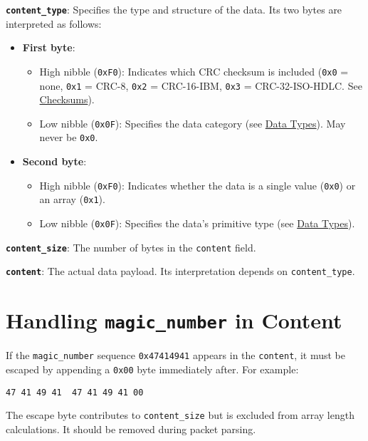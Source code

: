 \documentclass[a4paper]{article}
\begin{document}
\textbf{\texttt{content\_type}}: Specifies the type and structure of the data. Its two bytes are interpreted as follows:
\begin{itemize}
  \item \textbf{First byte}:
  \begin{itemize}
    \item High nibble (\texttt{0xF0}): Indicates which CRC checksum is included (\texttt{0x0} = none, \texttt{0x1} = CRC-8, \texttt{0x2} = CRC-16-IBM, \texttt{0x3} = CRC-32-ISO-HDLC. See \hyperref[checksums]{Checksums}).
    \item Low nibble (\texttt{0x0F}): Specifies the data category  (see \hyperref[data-types]{Data Types}). May never be \texttt{0x0}.
  \end{itemize}
  \item \textbf{Second byte}:
  \begin{itemize}
    \item High nibble (\texttt{0xF0}): Indicates whether the data is a single value (\texttt{0x0}) or an array (\texttt{0x1}).
    \item Low nibble (\texttt{0x0F}): Specifies the data's primitive type (see \hyperref[data-types]{Data Types}).
  \end{itemize}
\end{itemize}

\textbf{\texttt{content\_size}}: The number of bytes in the \texttt{content} field.

\textbf{\texttt{content}}: The actual data payload. Its interpretation depends on \texttt{content\_type}.

\section{Handling \texttt{magic\_number} in Content}
If the \texttt{magic\_number} sequence \texttt{0x47414941} appears in the \texttt{content}, it must be escaped by appending a \texttt{0x00} byte immediately after. For example:

\texttt{47 41 49 41 }\textrightarrow\texttt{ 47 41 49 41 00}

The escape byte contributes to \texttt{content\_size} but is excluded from array length calculations. It should be removed during packet parsing.
\end{document}
